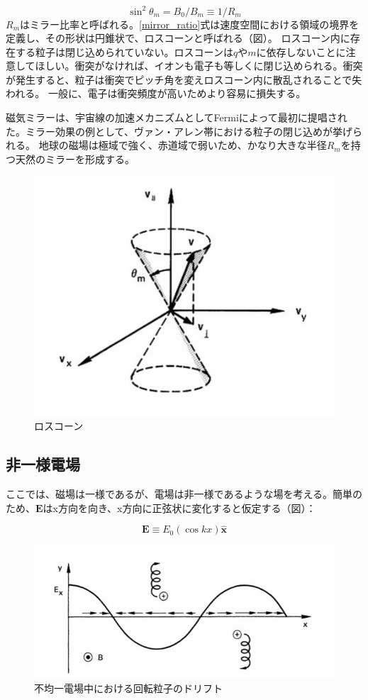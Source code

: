 \documentclass{ltjsarticle}
\numberwithin{equation}{section} %
\begin{document}
\begin{equation}
  \sin^2 \theta_m = B_0/B_m \equiv 1/R_m \label{mirror_ratio}
\end{equation}
$R_m$はミラー比率と呼ばれる。\eqref{mirror_ratio}式は速度空間における領域の境界を定義し、その形状は円錐状で、ロスコーンと呼ばれる（図）。
ロスコーン内に存在する粒子は閉じ込められていない。ロスコーンは$q$や$m$に依存しないことに注意してほしい。衝突がなければ、イオンも電子も等しくに閉じ込められる。衝突が発生すると、粒子は衝突でピッチ角を変えロスコーン内に散乱されることで失われる。
一般に、電子は衝突頻度が高いためより容易に損失する。

磁気ミラーは、宇宙線の加速メカニズムとしてFermiによって最初に提唱された。ミラー効果の例として、ヴァン・アレン帯における粒子の閉じ込めが挙げられる。
地球の磁場は極域で強く、赤道域で弱いため、かなり大きな半径$R_m$を持つ天然のミラーを形成する。

\begin{figure}[H]
  \centering
  \includegraphics[width=0.7\linewidth]{loss_cone.png}
  \caption{ロスコーン}
  \label{loss_cone}
\end{figure}


\subsection{非一様電場}
ここでは、磁場は一様であるが、電場は非一様であるような場を考える。簡単のため、$\bm{E}$はx方向を向き、x方向に正弦状に変化すると仮定する（図）：

\begin{equation}
  \bm{E} \equiv E_0(\cos kx)\hat{\bm{x}} \label{df.non}
\end{equation}

\begin{figure}[htbp]
  \centering
  \includegraphics[width=0.7\linewidth]{nonuniform_E.png}
  \caption{不均一電場中における回転粒子のドリフト}
  \label{nonuniform_E}
\end{figure}
\end{document}
